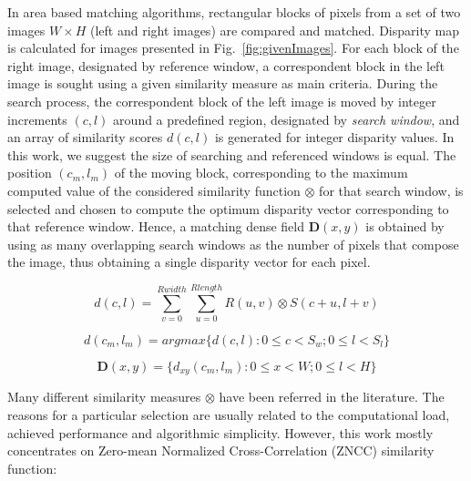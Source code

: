 \documentclass[conference]{IEEEtran}
\begin{document}
In area based matching algorithms, rectangular blocks of pixels from a set of two images $W \times H$ (left and right images) are compared and matched. Disparity map is calculated for images presented in Fig.~\ref{fig:givenImages}. For each block of the right image, designated by reference window, a correspondent block in the left image is sought using a given similarity measure as main criteria. During the search process, the correspondent block of the left image is moved by integer increments $(c,l)$ around a predefined region, designated by \textit{search window}, and an array of similarity scores $d(c,l)$ is generated for integer disparity values. In this work, we suggest the size of searching and referenced windows is equal. The position $(c_m, l_m)$ of the moving block, corresponding to the maximum computed value of the considered similarity function $\otimes$ for that search window, is selected and chosen to compute the optimum disparity vector corresponding to that reference window. Hence, a matching dense field $\mathbf{D}(x,y)$ is obtained by using as many overlapping search windows as the number of pixels that compose the image, thus obtaining a single disparity vector for each pixel.




\begin{equation}
d(c,l) = \sum_{v=0}^{Rwidth}\sum_{u=0}^{Rlength}R\left(u,v\right)\otimes S\left(c+u,l+v\right)
\end{equation}

\begin{equation}
d(c_m,l_m) = argmax\{d(c,l): 0\leq c < S_w; 0\leq l < S_l \}
\end{equation}

\begin{equation}
\mathbf{D}(x,y) = \{ d_{xy}(c_m,l_m): 0\leq x < W; 0\leq l < H \}
\end{equation}

Many different similarity measures $\otimes$ have been referred in the literature. The reasons for a particular selection are usually related to the computational load, achieved performance and algorithmic simplicity. However, this work mostly concentrates on Zero-mean Normalized Cross-Correlation (ZNCC) similarity function:
\end{document}
